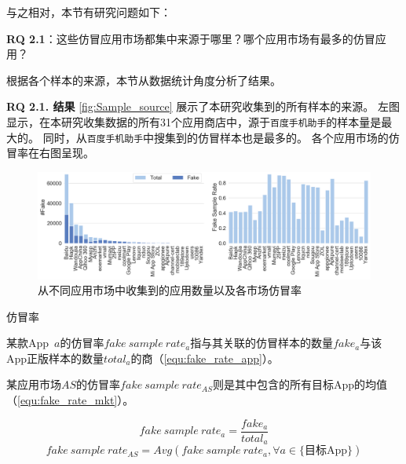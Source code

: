 与之相对，本节有研究问题如下：

{\bf RQ 2.1}：这些仿冒应用市场都集中来源于哪里？哪个应用市场有最多的仿冒应用？

根据各个样本的来源，本节从数据统计角度分析了结果。

{\bf RQ 2.1. 结果} \autoref{fig:Sample_source} 展示了本研究收集到的所有样本的来源。
左图显示，在本研究收集数据的所有31个应用商店中，源于\texttt{百度手机助手}的样本量是最大的。
同时，从\texttt{百度手机助手}中搜集到的仿冒样本也是最多的。
各个应用市场的仿冒率在右图呈现。

\begin{figure}[htbp]
	\centering
  \setlength{\belowcaptionskip}{-10pt}
	\includegraphics[width=\textwidth]{./Figures/edwin-Number_of_samples_collected_markets_3.png}
	\caption{从不同应用市场中收集到的应用数量以及各市场仿冒率}
	\label{fig:Sample_source}
\end{figure}

\begin{Def}
    仿冒率

    某款App~$a$的仿冒率$fake~sample~rate_a$指与其关联的仿冒样本的数量$fake_a$与该App正版样本的数量$total_a$的商（\autoref{equ:fake_rate_app}）。

    某应用市场$AS$的仿冒率$fake~sample~rate_{AS}$则是其中包含的所有目标App的均值（\autoref{equ:fake_rate_mkt}）。
\end{Def}

\begin{equation}
    fake~sample~rate_a = \frac{fake_a}{total_a}
    \label{equ:fake_rate_app}
\end{equation}
\begin{equation}
    fake~sample~rate_{AS} = Avg(fake~sample~rate_a, \forall a \in \text{\{目标App\}})
    \label{equ:fake_rate_mkt}
\end{equation}
\vspace{0.5mm}

